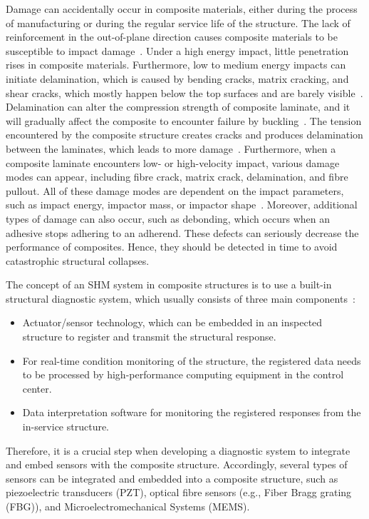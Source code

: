 Damage can accidentally occur in composite materials, either during the process of manufacturing or during the regular service life of the structure.
The lack of reinforce\-ment in the out-of-plane direction causes composite materials to be susceptible to impact damage~\cite{Cai2012}. 
Under a high energy impact, little penetration rises in composite materials.  
Furthermore, low to medium energy impacts can initiate delamination, which is caused by bending cracks, matrix cracking, and shear cracks,  which mostly happen below the top surfaces and are barely visible~\cite{Cai2012}. 
Delamination can alter the compression strength of composite laminate, and it will gradually affect the composite to encounter failure by buckling~\cite{NurAzrieBtSafri2018}.
The tension encountered by the composite structure creates cracks and produces delamination between the laminates, which leads to more damage~\cite{NurAzrieBtSafri2018}. 
Furthermore, when a composite laminate encounters low- or high-velocity impact, various damage modes can appear, including fibre crack, matrix crack, delamination, and fibre pullout.
All of these damage modes are dependent on the impact parameters, such as impact energy, impactor mass, or impactor shape~\cite{NurAzrieBtSafri2018}.
Moreover, additional types of damage can also occur, such as debonding, which occurs when an adhesive stops adhering to an adherend.
These defects can seriously decrease the performance of composites. Hence, they should be detected in time to avoid catastrophic structural collapses.

The concept of an SHM system in composite structures is to use a built-in structural diagnostic system, which usually consists of three main components~\cite{Hassani2022}: 
\begin{itemize}
	\item Actuator/sensor technology, which can be embedded in an inspected structure to register and transmit the structural response.
	\item For real-time condition monitoring of the structure, the registered data needs to be processed by high-performance computing equipment in the control center.
	\item Data interpretation software for monitoring the registered responses from the in-service structure.
\end{itemize}
Therefore, it is a crucial step when developing a diagnostic system to integrate and embed sensors with the composite structure.
Accordingly, several types of sensors can be integrated and embedded into a composite structure, such as piezoelectric transducers (PZT), optical fibre sensors (e.g., Fiber Bragg grating (FBG)), and Microele\-ctromechani\-cal Systems (MEMS).

